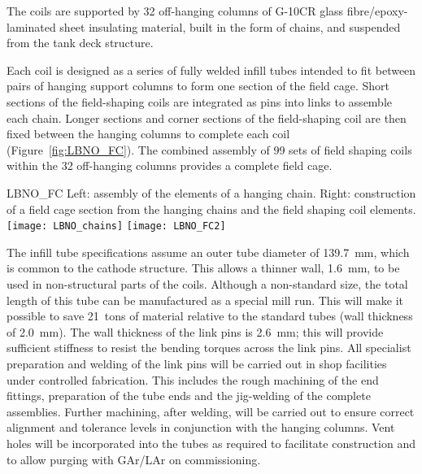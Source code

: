 The coils are supported by 32 off-hanging columns of G-10CR glass
fibre/epoxy-laminated sheet insulating material, built in the form of
chains, and suspended from the tank deck structure.

Each coil is designed as a series of fully welded infill tubes
intended to fit between pairs of hanging support columns to form one
section of the field cage.  Short sections of the field-shaping coils
are integrated as pins into links to assemble each chain.  Longer
sections and corner sections of the field-shaping coil are then fixed
between the hanging columns to complete each coil
(Figure~\ref{fig:LBNO_FC}). The combined assembly of 99 sets of field
shaping coils within the 32 off-hanging columns provides a complete
field cage.
\begin{cdrfigure}{LBNO_FC}
{\small Left: assembly of the elements of a hanging chain. Right: 
construction of a field cage section from the hanging chains and the field shaping coil elements.}
\texttt{[image: LBNO\_chains]} \hfill
\texttt{[image: LBNO\_FC2]}
\end{cdrfigure}

The infill tube specifications assume an outer tube diameter of 139.7~mm,
which is common to the cathode structure.  This allows a thinner wall,
1.6~mm, to be used in non-structural parts of the coils.  Although a
non-standard size, the total length of this tube can be manufactured
as a special mill run.  This will make it possible to save 21~tons of
material relative to the standard tubes (wall thickness of
2.0~mm). The wall thickness of the link pins is 2.6~mm; this will
provide sufficient stiffness to resist the bending torques across
the link pins.  All specialist preparation and welding of the link
pins will be carried out in shop facilities under controlled
fabrication.  This includes the rough machining of the end fittings,
preparation of the tube ends and the jig-welding of the complete
assemblies. Further machining, after welding, will be carried out to
ensure correct alignment and tolerance levels in conjunction with the
hanging columns.  Vent holes will be incorporated into the tubes as
required to facilitate construction and to allow purging with GAr/LAr
on commissioning.

